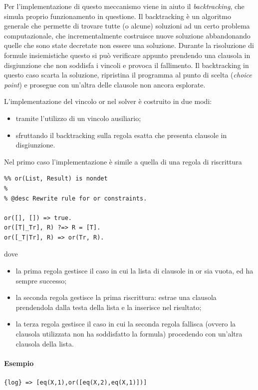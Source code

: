 \documentclass[12pt,a4paper,openright]{book} %
\begin{document}
Per l'implementazione di questo meccanismo viene in aiuto il \emph{backtracking}, che simula proprio funzionamento in questione. Il backtracking è un algoritmo generale che permette di trovare tutte (o alcune) soluzioni ad un certo problema computazionale, che incrementalmente costruisce nuove soluzione abbandonando quelle che sono state decretate non essere una soluzione. Durante la risoluzione di formule insiemistiche questo si può verificare appunto prendendo una clausola in disgiunzione che non soddisfa i vincoli e provoca il fallimento. Il backtracking in questo caso scarta la soluzione, ripristina il programma al punto di scelta (\emph{choice point}) e prosegue con un'altra delle clausole non ancora esplorate.

L'implementazione del vincolo or nel solver è costruito in due modi:
\begin{itemize}
\item tramite l'utilizzo di un vincolo ausiliario;
\item sfruttando il backtracking sulla regola esatta che presenta clausole in disgiunzione.
\end{itemize}

Nel primo caso l'implementazione è simile a quella di una regola di riscrittura
\begin{verbatim}
%% or(List, Result) is nondet
%
% @desc Rewrite rule for or constraints.

or([], []) => true.
or([T|_Tr], R) ?=> R = [T].
or([_T|Tr], R) => or(Tr, R).
\end{verbatim}
dove
\begin{itemize}
\item la prima regola gestisce il caso in cui la lista di clausole in or sia vuota, ed ha sempre successo;
\item la seconda regola gestisce la prima riscrittura: estrae una clausola prendendola dalla testa della lista e la inserisce nel risultato;
\item la terza regola gestisce il caso in cui la seconda regola fallisca (ovvero la clausola utilizzata non ha soddisfatto la formula) procedendo con un'altra clausola della lista.
\end{itemize}

\paragraph{Esempio}
\begin{verbatim}
{log} => [eq(X,1),or([eq(X,2),eq(X,1)])]
\end{verbatim}
\end{document}
